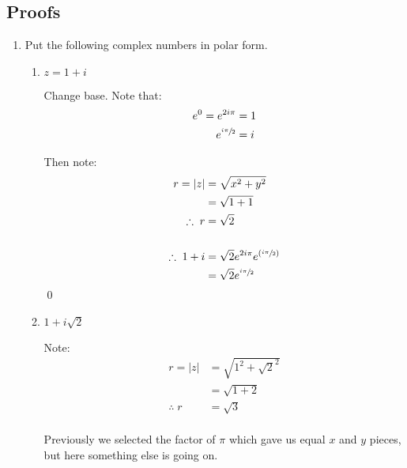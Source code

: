 \subsection{Proofs}
\begin{enumerate}


	\item Put the following complex numbers in polar form.
	      \begin{enumerate}


		      \item $z = 1 + i$

		            Change base. Note that:
		            \begin{align*}
			            e^0 = e^{2i\pi}     & = 1 \\
			            e^{\sfrac{i\pi}{2}} & = i \\
		            \end{align*}

		            Then note:
		            \begin{align*}
			            r = |z| & = \sqrt{x^2 + y^2}                         \\
			                    & = \sqrt{1 + 1}                             \\
			            \therefore \; r
			                    & = \sqrt{2}                                 \\
			            \\
			            \therefore \; 1 + i
			                    & = \sqrt{2} e^{2i\pi} e^{(\sfrac{i\pi}{2})} \\
			                    & = \sqrt{2}e^{\sfrac{i\pi}{2}}
		            \end{align*}
		            \qed

		      \item $1 + i\sqrt{2}$

		            Note:
		            \begin{align*}
			            r = |z| & = \sqrt{1^2 + \sqrt{2}^2} \\
			                    & = \sqrt{1 + 2}            \\
			            \therefore \; r
			                    & = \sqrt{3}                \\
		            \end{align*}

		            Previously we selected the factor of $\pi$ which gave us equal $x$ and $y$ pieces,
		            but here something else is going on.


\end{enumerate}
\end{enumerate}

